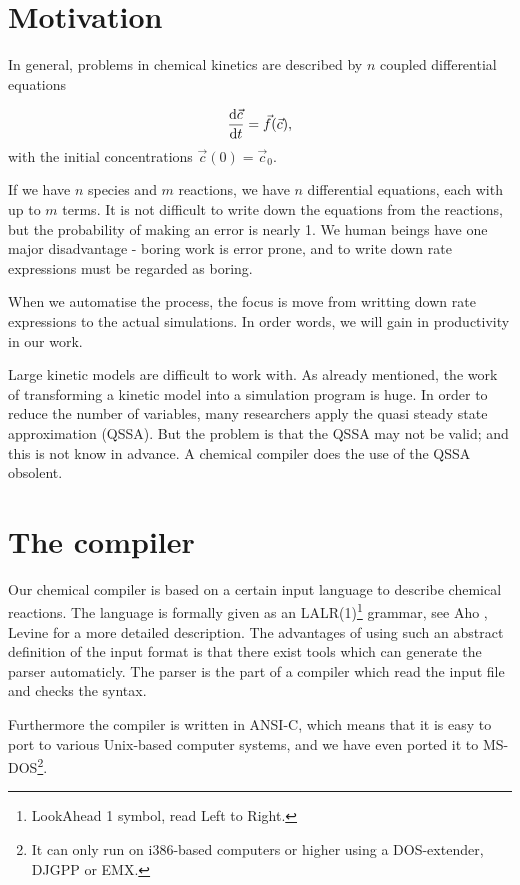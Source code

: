 \section{Motivation}
In general, problems in chemical kinetics are described by $n$
coupled differential equations

\begin{equation}
\label{KinODE}
  \frac{{\rm d}\vec{c}}{{\rm d}t} = \vec{f}(\vec{c}),
\end{equation}
with the initial concentrations $\vec{c}(0) = \vec{c}_0$.

If we have $n$ species and $m$ reactions, we have $n$ differential
equations, each with up to $m$ terms. It is not difficult to write
down the equations from the reactions, but the probability of making
an error is nearly 1. We human beings have one major disadvantage -
boring work is error prone, and to write down rate expressions must be
regarded as boring.

When we automatise the process, the focus is move from writting down
rate expressions to the actual simulations. In order words, we will
gain in productivity in our work.

Large kinetic models are difficult to work with. As already mentioned,
the work of transforming a kinetic model into a simulation program is
huge. In order to reduce the number of variables, many researchers apply
the quasi steady state approximation (QSSA). But the problem is that
the QSSA may not be valid; and this is not know in advance. A chemical
compiler does the use of the QSSA obsolent.

\section{The compiler}
Our chemical compiler is based on a certain input language to describe
chemical reactions. The language is formally given as an
LALR(1)\footnote{LookAhead 1 symbol, read Left to Right.}
grammar, see \eg Aho \etal \cite{Dragon}, Levine \etal \cite{YaccLex}
for a more detailed description. The advantages of using such an
abstract definition of the input format is that there exist tools
which can generate the parser automaticly. The parser is the part of a
compiler which read the input file and checks the syntax.

Furthermore the compiler is written in ANSI-C, which means that it is
easy to port to various Unix-based computer systems, and we have even
ported it to MS-DOS\footnote{It can only run on i386-based computers
or higher using a DOS-extender, \eg DJGPP or EMX.}.

